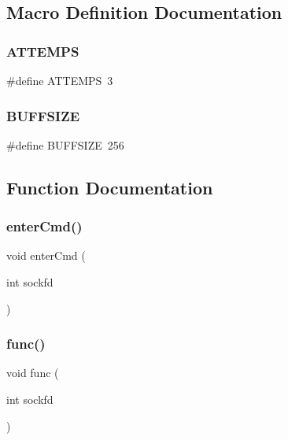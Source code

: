 \subsection{Macro Definition Documentation}
\mbox{\label{cli_8c_aacf47fd54627d81faf5662f0e03570b5}} 
\subsubsection{A\+T\+T\+E\+M\+PS}
{\footnotesize\ttfamily \#define A\+T\+T\+E\+M\+PS~3}

\mbox{\label{cli_8c_a39912bfe2a55f30e269196f9141d845d}} 
\subsubsection{B\+U\+F\+F\+S\+I\+ZE}
{\footnotesize\ttfamily \#define B\+U\+F\+F\+S\+I\+ZE~256}



\subsection{Function Documentation}
\mbox{\label{cli_8c_ad81d82423e7cb34edbc6a99e9cfc2681}} 
\subsubsection{enter\+Cmd()}
{\footnotesize\ttfamily void enter\+Cmd (\begin{DoxyParamCaption}\item[{int}]{sockfd }\end{DoxyParamCaption})}

\mbox{\label{cli_8c_ac17020a38607ab29ce18939d5194a32a}} 
\subsubsection{func()}
{\footnotesize\ttfamily void func (\begin{DoxyParamCaption}\item[{int}]{sockfd }\end{DoxyParamCaption})}

